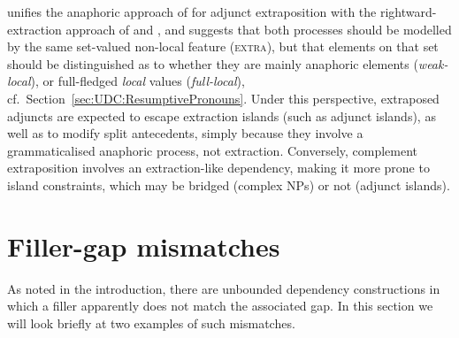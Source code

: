 \documentclass[output=paper
	        ,collection
	        ,collectionchapter
 	        ,biblatex
                ,babelshorthands
                ,newtxmath
                ,draftmode
                ,colorlinks, citecolor=brown
]{langscibook}
\begin{document}
{\begin{exe}
\ex
\begin{xlist}
\end{xlist}
\end{exe}


\citet{crysmann_b09xtra} unifies the anaphoric approach of
\citet{kiss_t02nllt} for adjunct extraposition with the
rightward-extraction approach of \citet{Keller:95} and
\cite{Mueller99a}, and suggests that both processes should be modelled
by the same set-valued non-local feature (\textsc{extra}), but that
elements on that set should be distinguished as to whether they are
mainly anaphoric elements (\textit{weak-local}), or full-fledged
\textit{local} values (\textit{full-local}), cf.\
Section~\ref{sec:UDC:ResumptivePronouns}.  Under this perspective,
extraposed adjuncts are expected to escape extraction islands (such as
adjunct islands), as well as to modify split antecedents, simply
because they involve a grammaticalised anaphoric process, not
extraction. Conversely, complement extraposition involves an
extraction-like dependency, making it more prone to island
constraints, which may be bridged (complex NPs) or not (adjunct
islands).




\section{Filler-gap mismatches}
\label{sec:UDC:FillerGapMismatches}

As noted in the introduction, there are unbounded dependency
constructions in which a filler apparently does not match the
associated gap. In this section we will look briefly at two examples
of such mismatches.

}
\end{document}
